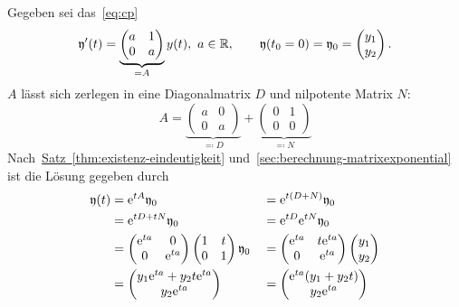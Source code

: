 \begin{example*}
    Gegeben sei das~\ref{eq:cp}
    \begin{equation*}
        \mathfrak{y}'(t) = \underbrace{\begin{pmatrix} a & 1\\ 0 & a \end{pmatrix}}_{= A} y(t),\ a \in \mathbb{R},
        \qquad \mathfrak{y}(t_0 = 0) = \mathfrak{y}_0 = \begin{pmatrix}y_1\\ y_2\end{pmatrix}.
    \end{equation*}
    $A$ lässt sich zerlegen in eine Diagonalmatrix $D$ und nilpotente Matrix $N$:
    \begin{equation*}
        A = \underbrace{\begin{pmatrix} a & 0\\ 0 & a \end{pmatrix}}_{\eqqcolon D}
            + \underbrace{\begin{pmatrix} 0 & 1\\ 0 & 0 \end{pmatrix}}_{\eqqcolon N}
    \end{equation*}
    Nach~\hyperref[thm:existenz-eindeutigkeit]{Satz~\ref*{thm:existenz-eindeutigkeit}} und~\autoref{sec:berechnung-matrixexponential} ist die Lösung gegeben durch
    \begin{alignat*}{2}
        \mathfrak{y}(t) &= \mathrm{e}^{t A} \mathfrak{y}_0
            &&= \mathrm{e}^{t (D + N)} \mathfrak{y}_0\\
        &= \mathrm{e}^{t D + t N} \mathfrak{y}_0
            &&= \mathrm{e}^{t D} \mathrm{e}^{t N} \mathfrak{y}_0\\
        &= \begin{pmatrix} \mathrm{e}^{t a} & 0\\ 0 & \mathrm{e}^{t a} \end{pmatrix} \begin{pmatrix} 1 & t\\ 0 & 1 \end{pmatrix} \mathfrak{y}_0
            &&= \begin{pmatrix} \mathrm{e}^{t a} & t \mathrm{e}^{t a}\\ 0 & \mathrm{e}^{t a} \end{pmatrix} \begin{pmatrix}y_1\\ y_2\end{pmatrix}\\
        &= \begin{pmatrix} y_1 \mathrm{e}^{t a} + y_2 t \mathrm{e}^{t a}\\ y_2 \mathrm{e}^{t a} \end{pmatrix}
            &&= \begin{pmatrix} \mathrm{e}^{t a} (y_1 + y_2 t)\\ y_2 \mathrm{e}^{t a} \end{pmatrix}
    \end{alignat*}
\end{example*}